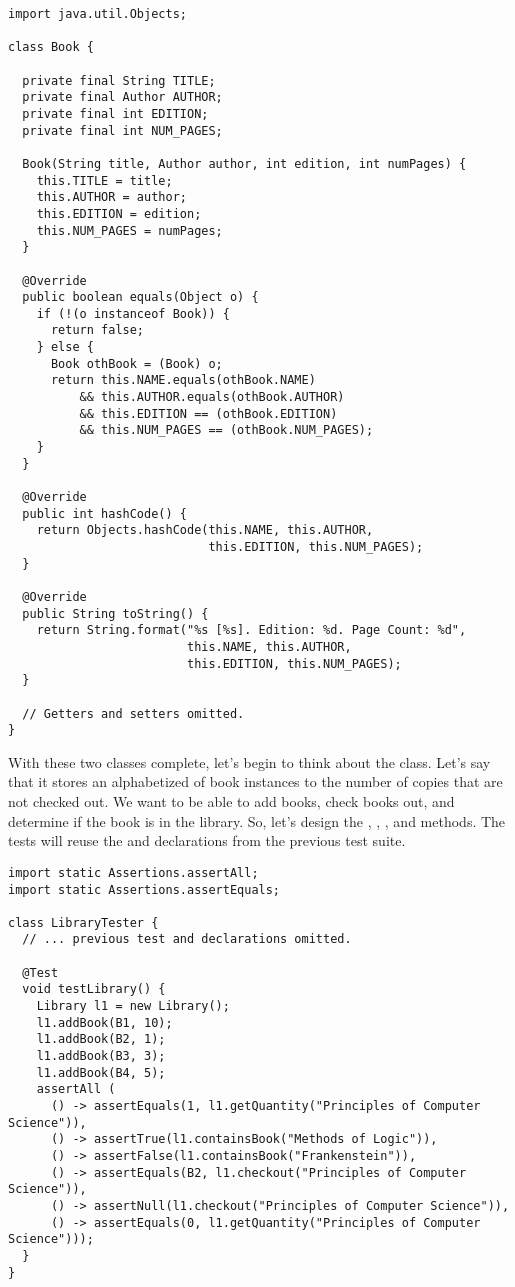 \begin{lstlisting}[language=MyJava]
import java.util.Objects;

class Book {

  private final String TITLE;
  private final Author AUTHOR;
  private final int EDITION;
  private final int NUM_PAGES;

  Book(String title, Author author, int edition, int numPages) {
    this.TITLE = title;
    this.AUTHOR = author;
    this.EDITION = edition;
    this.NUM_PAGES = numPages;
  }

  @Override
  public boolean equals(Object o) {
    if (!(o instanceof Book)) {
      return false;
    } else {
      Book othBook = (Book) o;
      return this.NAME.equals(othBook.NAME)
          && this.AUTHOR.equals(othBook.AUTHOR)
          && this.EDITION == (othBook.EDITION)
          && this.NUM_PAGES == (othBook.NUM_PAGES);
    }
  }
  
  @Override
  public int hashCode() {
    return Objects.hashCode(this.NAME, this.AUTHOR, 
                            this.EDITION, this.NUM_PAGES);
  }

  @Override
  public String toString() {
    return String.format("%s [%s]. Edition: %d. Page Count: %d",
                         this.NAME, this.AUTHOR, 
                         this.EDITION, this.NUM_PAGES);
  }

  // Getters and setters omitted.
}
\end{lstlisting}

\newpage %
With these two classes complete, let's begin to think about the  class. 
Let's say that it stores an alphabetized  of book instances to the number of copies that are not checked out. 
We want to be able to add books, check books out, and determine if the book is in the library.
So, let's design the , , , and  methods.
The tests will reuse the  and  declarations from the previous test suite.

\enlargethispage{-3\baselineskip}
\begin{lstlisting}[language=MyJava]
import static Assertions.assertAll;
import static Assertions.assertEquals;

class LibraryTester {
  // ... previous test and declarations omitted.

  @Test
  void testLibrary() {
    Library l1 = new Library();
    l1.addBook(B1, 10);
    l1.addBook(B2, 1);
    l1.addBook(B3, 3);
    l1.addBook(B4, 5);
    assertAll (
      () -> assertEquals(1, l1.getQuantity("Principles of Computer Science")),
      () -> assertTrue(l1.containsBook("Methods of Logic")),
      () -> assertFalse(l1.containsBook("Frankenstein")),
      () -> assertEquals(B2, l1.checkout("Principles of Computer Science")),
      () -> assertNull(l1.checkout("Principles of Computer Science")),
      () -> assertEquals(0, l1.getQuantity("Principles of Computer Science")));
  }
}
\end{lstlisting}

